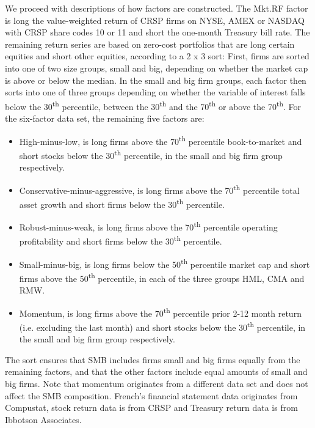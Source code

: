 We proceed with descriptions of how factors are constructed. The Mkt.RF factor is long the value-weighted return of CRSP firms on NYSE, AMEX or NASDAQ with CRSP share codes 10 or 11 and short the one-month Treasury bill rate. The remaining return series are based on zero-cost portfolios that are long certain equities and short other equities, according to a 2 x 3 sort: First, firms are sorted into one of two size groups, small and big, depending on whether the market cap is above or below the median. In the small and big firm groups, each factor then sorts into one of three groups depending on whether the variable of interest falls below the 30\textsuperscript{th} percentile, between the 30\textsuperscript{th} and the 70\textsuperscript{th} or above the 70\textsuperscript{th}. For the six-factor data set, the remaining five factors are:
\begin{itemize}
  \item High-minus-low, is long firms above the 70\textsuperscript{th} percentile book-to-market and short stocks below the 30\textsuperscript{th} percentile, in the small and big firm group respectively.
  \item Conservative-minus-aggressive, is long firms above the 70\textsuperscript{th} percentile total asset growth and short firms below the 30\textsuperscript{th} percentile. 
  \item Robust-minus-weak, is long firms above the 70\textsuperscript{th} percentile operating profitability and short firms below the 30\textsuperscript{th} percentile. 
  \item Small-minus-big, is long firms below the 50\textsuperscript{th} percentile market cap and short firms above the 50\textsuperscript{th} percentile, in each of the three groups HML, CMA and RMW.
  \item Momentum, is long firms above the 70\textsuperscript{th} percentile prior 2-12 month return (i.e. excluding the last month) and short stocks below the 30\textsuperscript{th} percentile, in the small and big firm group respectively.
\end{itemize}
The sort ensures that SMB includes firms small and big firms equally from the remaining factors, and that the other factors include equal amounts of small and big firms. Note that momentum originates from a different data set and does not affect the SMB composition. French's financial statement data originates from Compustat, stock return data is from CRSP and Treasury return data is from Ibbotson Associates.

